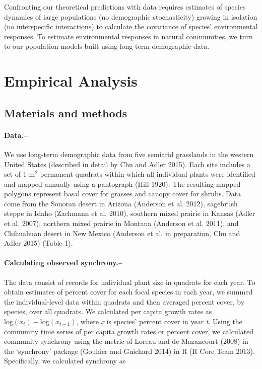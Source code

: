 \documentclass[11pt,]{article}
\begin{document}
Confronting our theoretical predictions with data requires estimates of
species dynamics of large populations (no demographic stochasticity)
growing in isolation (no interspecific interactions) to calculate the
covariance of species' environmental responses. To estimate
environmental responses in natural communities, we turn to our
population models built using long-term demographic data.

\section{Empirical Analysis}\subsection{Materials and methods}

\paragraph{Data.--}\label{data.}

We use long-term demographic data from five semiarid grasslands in the
western United States (described in detail by Chu and Adler 2015). Each
site includes a set of 1-\(\text{m}^2\) permanent quadrats within which
all individual plants were identified and mapped annually using a
pantograph (Hill 1920). The resulting mapped polygons represent basal
cover for grasses and canopy cover for shrubs. Data come from the
Sonoran desert in Arizona (Anderson et al. 2012), sagebrush steppe in
Idaho (Zachmann et al. 2010), southern mixed prairie in Kansas (Adler et
al. 2007), northern mixed prairie in Montana (Anderson et al. 2011), and
Chihuahuan desert in New Mexico (Anderson et al. in preparation, Chu and
Adler 2015) (Table 1).

\paragraph{Calculating observed
synchrony.--}\label{calculating-observed-synchrony.}

The data consist of records for individual plant size in quadrats for
each year. To obtain estimates of percent cover for each focal species
in each year, we summed the individual-level data within quadrats and
then averaged percent cover, by species, over all quadrats. We
calculated per capita growth rates as
\(\text{log}(x_t) - \text{log}(x_{t-1})\), where \emph{x} is species'
percent cover in year \emph{t}. Using the community time series of per
capita growth rates or percent cover, we calculated community synchrony
using the metric of Loreau and {{de Mazancourt}} (2008) in the
`synchrony' package (Gouhier and Guichard 2014) in R (R Core Team 2013).
Specifically, we calculated synchrony as
\end{document}
